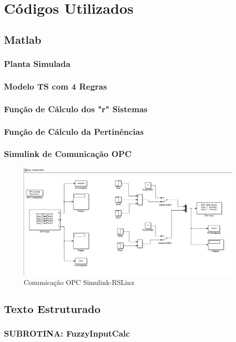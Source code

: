 \appendix
{}%

\chapter{Códigos Utilizados} \label{anexoCodigos}

\section{Matlab}
	\subsection{Planta Simulada}
		

	\subsection{Modelo TS com 4 Regras}
		
	
	\subsection{Função de Cálculo dos "r" Sistemas }
		
	
	\subsection{Função de Cálculo da Pertinências}
		
	
	\subsection{Simulink de Comunicação OPC}
		\begin{figure}[H]
			\begin{centering}
				\includegraphics[width=\textwidth]{img/simOPC.png}
				\par\end{centering}
			\caption{Comunicação OPC Simulink-RSLinx}
		\end{figure}
			
\section{Texto Estruturado}
	\subsection{SUBROTINA: FuzzyInputCalc}
	

%

